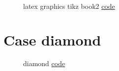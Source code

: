 \documentclass{article}
\begin{document}
\begin{figure}[H]
	\centering
	
	\caption{latex graphics tikz book2 \href{https:/github.com/cauliyang/learn_tikz/blob/main/source/latex_graphics_tikz_book2.tex}{code} }
	\label{fig:latex graphics tikz book2}
\end{figure}

\section{Case diamond}

\begin{figure}[H]
	\centering
	
	\caption{diamond \href{https:/github.com/cauliyang/learn_tikz/blob/main/source/diamond.tex}{code} }
	\label{fig:diamond}
\end{figure}
\end{document}
